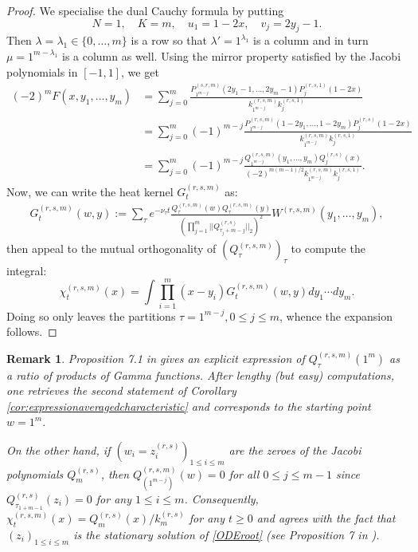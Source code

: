 \documentclass[12pt,reqno]{amsart}
\newtheorem{remark}{Remark}
\begin{document}
\begin{proof}
	We specialise the dual Cauchy formula by putting 
    $$
    N=1,\quad K= m, \quad u_1 = 1-2x, \quad v_j = 2y_j-1.
    $$ 
    Then $\lambda = \lambda_1 \in \{0, \dots, m\}$ is a row so that $\lambda' = 1^{\lambda_1}$ is a column and in turn $\mu = 1^{m-\lambda_1}$ is a column as well.
	Using the mirror property satisfied by the Jacobi polynomials in $[-1,1]$, we get
	\begin{align*}
		(-2)^mF(x, y_1, \dots, y_m) & = \sum_{j=0}^m \frac{P_{1^{m-j}}^{(s,r,m)}(2y_1-1,\dots,
		2y_m-1) P_{j}^{(r,s,1)}(1-2x)}{k_{1^{m-j}}^{(r,s,m)}k_{j}^{(r,s,1)}}
		\\& = \sum_{j=0}^m (-1)^{m-j} \frac{P_{1^{m-j}}^{(r,s,m)}(1-2y_1,\dots,
		1-2y_m) P_{j}^{(r,s)}(1-2x)}{k_{1^{m-j}}^{(r,s,m)}k_{j}^{(r,s,1)}}
		\\& = \sum_{j=0}^m (-1)^{m-j} \frac{Q_{1^{m-j}}^{(r,s,m)}(y_1,\dots,
		y_m) Q_{j}^{(r,s)}(x)}{(-2)^{m(m-1)/2}k_{1^{m-j}}^{(r,s,m)}k_{j}^{(r,s,1)}}.
	\end{align*}
	Now, we can write the heat kernel $G_t^{(r,s,m)}$ as:
	\begin{align*}
		G_t^{(r,s,m)}(w,y) := \sum_{\tau} e^{-\nu_\tau t}
		\frac{Q_\tau^{(r,s,m)}(w)Q_\tau^{(r,s,m)}(y)}{\left(\prod_{j=1}^m||Q_{\tau_j+m-j}^{(r,s)}||_2\right)^2} W^{(r,s,m)}(y_1,\dots, y_m),
	\end{align*}
	then appeal to the mutual orthogonality of $(Q_\tau^{(r,s,m)})_{\tau}$ to compute the integral:
	\begin{equation*}
		\chi_t^{(r,s,m)}(x) = \int \prod_{i=1}^m(x-y_i)G_t^{(r,s,m)}(w,y) dy_1\cdots dy_m.
	\end{equation*}
	Doing so only leaves the partitions $\tau = 1^{m-j}, 0 \leq j \leq m$, whence the expansion follows. 
    \end{proof}
\begin{remark}
	Proposition 7.1 in \cite{MR3075094} gives an explicit expression of
	$Q_\tau^{(r,s,m)}(1^m)$ as a ratio of products of Gamma functions. After lengthy (but easy) computations, one retrieves the second statement of Corollary \ref{cor:expressionaveragedcharacteristic} and corresponds to the starting point $w = 1^m$. 
    
    On the other hand, if $(w_i = z_i^{(r,s)})_{1 \leq i \leq m}$ are the zeroes of the Jacobi polynomials $Q_m^{(r,s)}$, then $Q_{(1^{m-j})}^{(r,s,m)}(w) = 0$ for all $0 \leq j \leq m-1$ since $Q_{\tau_{1+m-1}}^{(r,s)}(z_i) = 0$ for any $1 \leq i \leq m$. Consequently, $\chi_t^{(r,s,m)}(x) = Q_m^{(r,s)}(x)/k_m^{(r,s)}$ for any $t \geq 0$ and agrees with the fact that $(z_i)_{1 \leq i \leq m}$ is the stationary solution of \eqref{ODEroot} (see Proposition 7 in \cite{MR4673381}).
\end{remark}
\end{document}
